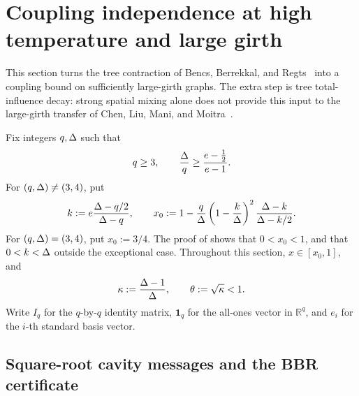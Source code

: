 \section{Coupling independence at high temperature and large girth}
\label{sec:bbr-large-girth}

This section turns the tree contraction of
Bencs, Berrekkal, and Regts~\cite{BencsBerrekkalRegts2025Trees} into a
coupling bound on sufficiently large-girth graphs.  The
extra step is tree total-influence decay: strong spatial mixing alone does
not provide this input to the large-girth transfer of Chen, Liu, Mani, and
Moitra~\cite{CLMM2023}.

Fix integers \(q,\Delta\) such that
\begin{equation}
 q\ge3,\qquad
 \frac{\Delta}{q}\ge\frac{e-\frac12}{e-1}.
 \label{eq:bbr-parameters}
\end{equation}
For \((q,\Delta)\ne(3,4)\), put
\begin{equation}
 k:=e\frac{\Delta-q/2}{\Delta-q},
 \qquad
 x_0:=1-\frac q{\Delta}
       \left(1-\frac k{\Delta}\right)^2
       \frac{\Delta-k}{\Delta-k/2}.
 \label{eq:bbr-x0}
\end{equation}
For \((q,\Delta)=(3,4)\), put \(x_0:=3/4\).
The proof of  shows that \(0<x_0<1\), and
that \(0<k<\Delta\) outside the exceptional case.
Throughout this section, \(x\in[x_0,1]\), and
\begin{equation}
 \kappa:=\frac{\Delta-1}{\Delta},
 \qquad
 \theta:=\sqrt\kappa<1.
 \label{eq:bbr-kappa}
\end{equation}
Write \(I_q\) for the \(q\)-by-\(q\) identity matrix,
\(\mathbf1_q\) for the all-ones vector in \(\mathbb R^q\), and \(e_i\)
for the \(i\)-th standard basis vector.

\subsection{Square-root cavity messages and the BBR certificate}

